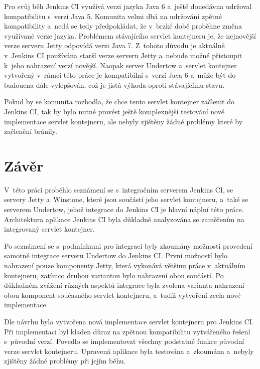         Pro svůj běh Jenkins CI využívá verzi jazyka Java 6 a~ještě donedávna
        udržoval kompatibilitu s~verzí Java 5. Komunita
        velmi dbá na udržování zpětné kompatibility
        a~nedá se tedy předpokládat,
        že v~brzké době proběhne změna využívané verze jazyka.
        Problémem stávajícího servlet kontejneru je, že 
        nejnovější verze serveru Jetty odpovídá verzi Java 7.
        Z~tohoto důvodu je aktuálně v~Jenkins CI používána
        starší verze serveru Jetty a~nebude možné přistoupit k~jeho
        nahrazení verzí novější.
        Naopak server Undertow a~servlet kontejner vytvořený v~rámci této práce
        je kompatibilní s~verzí Java 6
        a~může být do budoucna dále vylepšován, což je jistá výhoda oproti stávajícímu
        stavu. 

        Pokud by se komunita rozhodla, že chce tento servlet kontejner
        začlenit do Jenkins CI, tak by bylo nutné provést ještě
        komplexnější testování nové implementace servlet kontejneru, 
        ale nebyly zjištěny žádné
        problémy které by začlenění bránily.
    


\chapter{Závěr}
    V~této práci proběhlo seznámení se s~integračním serverem Jenkins CI,
    se servery Jetty a~Winstone, které jsou součástí jeho servlet kontejneru,
    a~také se serverem Undertow, jehož integrace do Jenkins CI je hlavní
    náplní této práce. Architektura aplikace Jenkins CI byla
    důkladně analyzována se zaměřením na integrovaný
    servlet kontejner.

    Po seznámení se s~podmínkami pro integraci byly
    zkoumány možnosti provedení samotné integrace serveru Undertow do Jenkins CI.
    První možností bylo nahrazení pouze komponenty
    Jetty, která vykonává většinu práce v~aktuálním kontejneru, zatímco druhou variantou bylo
    nahrazení obou součástí. 
    Po důkladném zvážení různých aspektů integrace byla 
    zvolena varianta nahrazení obou komponent současného 
    servlet kontejneru, a~tudíž vytvoření zcela nové implementace.

    Dle návrhu byla vytvořena nová implementace servlet kontejneru
    pro Jenkins CI. Při implementaci byl kladen důraz na zpětnou kompatibilitu
    vytvářeného řešení s~původní verzí. Povedlo se implementovat všechny podstatné
    funkce původní verze servlet kontejneru. Upravená
    aplikace byla testována a~zkoumána a~nebyly zjištěny žádné problémy
    při jejím běhu.

